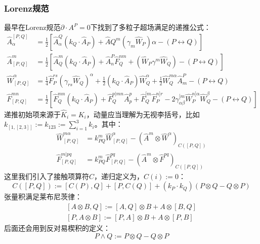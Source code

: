 \subsubsection{Lorenz规范}
最早在Lorenz规范$\partial\cdot A^P = 0 $下找到了多粒子超场满足的递推公式：
\begin{equation}
	\begin{aligned}
	\hat{A}_\alpha^{[P,Q]}&=\frac{1}{2}\left[\hat{A}_\alpha^Q(k_Q\cdot\hat{A}_P)+\hat{A}Q^m(\gamma_m\hat{W}_P)\alpha-(P\leftrightarrow Q)\right]\\
	\hat{A}_{[P,Q]}^m&=\frac{1}{2}\left[\hat{A}_Q^m(k_Q\cdot\hat{A}_P)+\hat{A}_n^P\hat{F}_Q^{nm}+(\hat{W}_P\gamma^m\hat{W}_Q)-(P\leftrightarrow Q)\right]\\
	\hat{W}_{[P,Q]}^{\alpha}&=\frac{1}{4}\hat{F}_P^{rs}(\gamma_{rs}\hat{W}_Q)^\alpha+\frac{1}{2}(k_Q\cdot\hat{A}_P)\hat{W}_Q^\alpha+\frac{1}{2}\hat{W}_Q^{m\alpha}\hat{A}_m^P-(P\leftrightarrow Q)\\
	\hat{F}_{[P,Q]}^{mn}&=\frac{1}{2}{\left[\hat{F}_Q^{mn}(k_Q\cdot\hat{A}_P)+\hat{F}_Q^{p|mn}\hat{A}_p^p+\hat{F}_Q^{[m}\hat{F}_P^{n]r}-2\gamma_{\alpha\beta}^{[m}\hat{W}_P^{n]\alpha}\hat{W}_Q^\beta-(P\leftrightarrow Q)\right]}
\end{aligned}
\end{equation}
递推初始项来源于$\hat K_i = K_i$，动量应当理解为无视李括号，比如$k_{[1,[2,3]]}:=k_{123}:=\sum_{i=1}^3k_i$。其中：
\begin{equation}
\begin{aligned}
		\hat{W}_{[P,Q]}^{m\alpha} &= k_{PQ}^m \hat{W}_{[P,Q]}^\alpha - (\hat{A}^m \otimes \hat{W}^\alpha)_{C([P,Q])} \\
	\hat{F}_{[P,Q]}^{m|pq} &= k_{PQ}^m \hat{F}_{[P,Q]}^{pq} - (\hat{A}^m \otimes \hat{F}^{pq})_{C([P,Q])}
\end{aligned}
\end{equation}
这里我们引入了接触项算符$C$，递归定义为，$C(i):= 0 $：
\begin{equation}
	C([P,Q]):=[C(P),Q]+[P,C(Q)]+(k_P\cdot k_Q)(P\otimes Q-Q\otimes P)
\end{equation}
张量积满足莱布尼茨律：
\begin{equation}
\begin{aligned}
		[A\otimes B,Q]:=[A,Q]\otimes B+A\otimes[B,Q]\\
	[P,A\otimes B]:=[P,A]\otimes B+A\otimes[P,B]
\end{aligned}
\end{equation}
后面还会用到反对易楔积的定义：
\begin{equation}
	P\wedge Q:=P\otimes Q-Q\otimes P
\end{equation}
